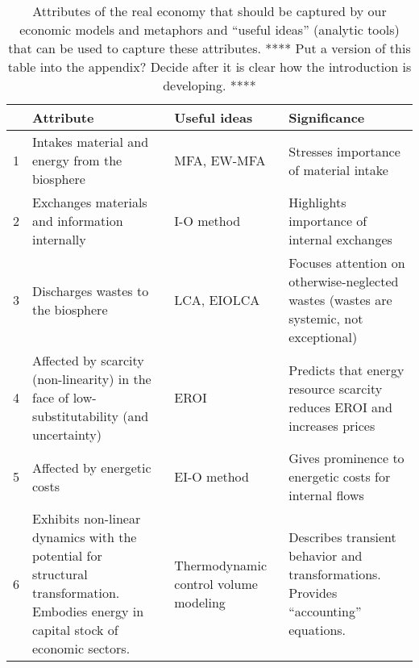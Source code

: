 {
\renewcommand{\arraystretch}{1.5}
\setlength{\tabcolsep}{10pt}

\begin{landscape}
\begin{table}
\label{tab:metabolic_economy}
\caption{Attributes of the real economy that should be captured by our economic models and metaphors 
				and ``useful ideas'' (analytic tools) that can be used to capture these attributes. **** Put a version of this table into the appendix? 
				Decide after it is clear how the introduction is developing. ****}
\begin{tabular}{m{0.1cm}m{7cm}m{3cm}m{6cm}}

\toprule
																													&	
	\textbf{Attribute}																					&
	\textbf{Useful ideas}																				&
	\textbf{Significance}																				\\

\midrule

1																													&	
	Intakes material and energy from the biosphere										&
	MFA, EW-MFA																							&
	Stresses importance of material intake													\\[4pt]
2																													&
	Exchanges materials and information internally										&
	I-O method																								&
	Highlights importance of internal exchanges											\\[4pt]
3																													&
	Discharges wastes to the biosphere															&
	LCA, EIOLCA																								&
	Focuses attention on otherwise-neglected wastes 
		(wastes are systemic, not exceptional)												\\[4pt]
4																													&
	Affected by scarcity (non-linearity) in the face of 
		low-substitutability (and uncertainty)													&
		EROI																										&
		Predicts that energy resource scarcity reduces EROI 
			and increases prices																			\\[4pt]
5																													&
	Affected by energetic costs																		&
	EI-O method																								&
	Gives prominence to energetic costs for internal flows							\\[4pt]
6																													&
	Exhibits non-linear dynamics with 
		the potential for structural transformation.
		Embodies energy in capital stock of economic sectors.						&
	Thermodynamic control volume modeling												&
	Describes transient behavior and transformations.
		Provides ``accounting'' equations.															\\
		
\bottomrule

\end{tabular}
\end{table}
\end{landscape}

}

